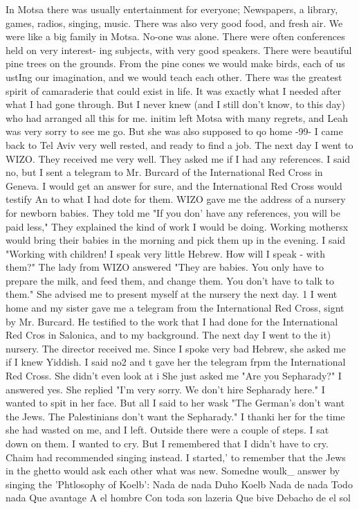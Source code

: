 {In Motsa there was usually entertainment for everyone; Newspapers, a library, games, 
radios, singing, music. There was also very good food, and fresh air. We were like a big 
family in Motsa. No-one was alone. There were often conferences held on very interest-
ing subjects, with very good speakers. There were beautiful pine trees on the grounds. 
From the pine cones we would make birds, each of us ustIng our imagination, and we would 
teach each other. There was the greatest spirit of camaraderie that could exist in life. 
It was exactly what I needed after what I had gone through. But I never knew (and I still 
don't know, to this day) who had arranged all this for me. 
initim left Motsa with many regrets, and Leah was very sorry to see me go. But she 
was also supposed to qo home 
-99- 
I came back to Tel Aviv very well rested, and ready to find a job. The next day I 
went to WIZO. They received me very well. They asked me if I had any references. I 
said no, but I sent a telegram to Mr. Burcard of the International Red Cross in Geneva. 
I would get an answer for sure, and the International Red Cross would testify An to what 
I had dote for them. 
WIZO gave me the address of a nursery for newborn babies. They told me "If you don' 
have any references, you will be paid less," They explained the kind of work I would be 
doing. Working mothersx would bring their babies in the morning and pick them up in the 
evening. I said "Working with children! I speak very little Hebrew. How will I speak - 
with them?" The lady from WIZO answered "They are babies. You only have to prepare the 
milk, and feed them, and change them. You don't have to talk to them." She advised me 
to present myself at the nursery the next day. 
1 
I went home and my sister gave me a telegram from the International Red Cross, signt 
by Mr. Burcard. He testified to the work that I had done for the International Red Cros 
in Salonica, and to my background. The next day I went to the it) nursery. The director 
received me. Since I spoke very bad Hebrew, she asked me if I knew Yiddish. I said no2 
and t gave her the telegram frpm the International Red Cross. She didn't even look at i 
She just asked me "Are you Sepharady?" I answered yes. She replied "I'm very sorry. 
We don't hire Sepharady here." I wanted to spit in her face. But all I said to her wask 
"The German's don't want the Jews. The Palestinians don't want the Sepharady." I thanki 
her for the time she had wasted on me, and I left. 
Outside there were a couple of steps. I sat down on them. I wanted to cry. But I 
remembered that I didn't have to cry. Chaim had recommended singing instead. I started,' 
to remember that the Jews in the ghetto would ask each other what was new. Somedne woulk_ 
answer by singing the 'Phtlosophy of Koelb': 
Nada de nada 
Duho Koelb 
Nada de nada 
Todo nada 
Que avantage 
A el hombre 
Con toda son lazeria 
Que bive 
Debacho de el sol 



}
